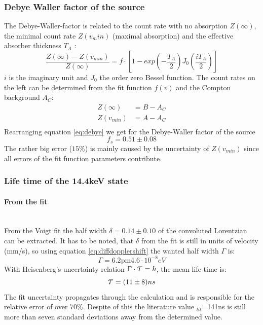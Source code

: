 \subsubsection{Debye Waller factor of the source}
The Debye-Waller-factor is related to the count rate with no absorption $Z(\infty)$, the minimal count rate $Z(v_min)$ (maximal absorption) and the effective absorber thickness $T_A$ \cite{Wegener}:
\begin{equation}
\frac{Z(\infty)-Z(v_{min})}{Z(\infty)}=f\cdot [1-exp(-\frac{T_A}{2})J_0(\frac{iT_A}{2})]
\label{eq:debye}
\end{equation}
$i$ is the imaginary unit and $J_0$ the order zero Bessel function. The count rates on the left can be determined from the fit function $f(v)$ and the Compton background $A_C$:
\begin{equation}
\begin{aligned}
Z(\infty) &= B - A_C\\
Z(v_{min}) &= A-A_C\\
\end{aligned}
\end{equation}
Rearranging equation \ref{eq:debye} we get for the Debye-Waller factor of the source
\begin{equation}
f_s= 0.51\pm0.08
\end{equation}
The rather big error ($15\%$) is mainly caused by the uncertainty of $Z(v_{min})$ since all errors of the fit function parameters contribute.

\subsubsection{Life time of the 14.4keV state}
\paragraph{From the fit}\ \\
From the Voigt fit the half width $\delta = 0.14 \pm 0.10$ of the convoluted Lorentzian can be extracted. It has to be noted, that $\delta$ from the fit is still in units of velocity (mm/s), so using equation \ref{eq:diffdopplershift} the wanted half width $\Gamma$ is:
\begin{equation}
\Gamma  = \unit{6.2\pm4.6\cdot 10^{-8}}{eV}
\end{equation}
With Heisenberg's uncertainty relation $\Gamma \cdot \scalebox{1.5}{$\tau$}=\hbar$, the mean life time is:
\begin{equation}
\scalebox{1.5}{$\tau$}= (11\pm8)ns
\end{equation}
The fit uncertainty propagates through the calculation and is responsible for the 
relative error of over $70\%$. Despite of this the literature value \scalebox{1.5}{$\tau$}$_{lit}$=141ns is still more than seven standard deviations away from the determined value.

